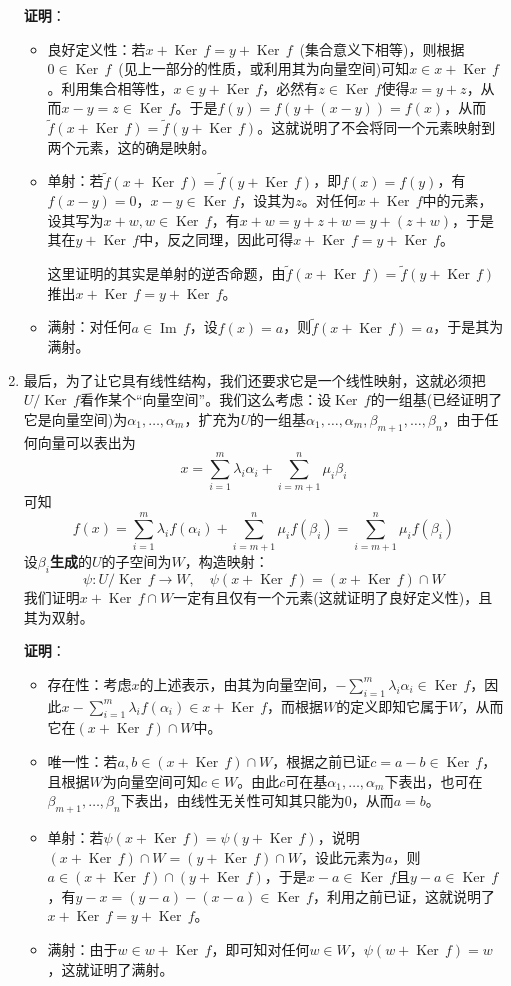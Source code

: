 \documentclass[a4paper,UTF8,fontset=windows]{ctexart}
\DeclareMathOperator{\im}{Im\,}
\DeclareMathOperator{\Ker}{Ker\,}
\newcommand*{\note}{\noindent *}
\begin{document}
\begin{enumerate}
    \textbf{证明}：
    \begin{itemize}
        \item 良好定义性：若$x+\Ker f=y+\Ker f$\ (集合意义下相等)，则根据$0\in\Ker f$\ (见上一部分的性质，或利用其为向量空间)可知$x\in x+\Ker f$。利用集合相等性，$x\in y+\Ker f$，必然有$z\in\Ker f$使得$x=y+z$，从而$x-y=z\in\Ker f$。于是$f(y)=f(y+(x-y))=f(x)$，从而$\tilde{f}(x+\Ker f)=\tilde{f}(y+\Ker f)$。这就说明了不会将同一个元素映射到两个元素，这的确是映射。
        \item 单射：若$\tilde{f}(x+\Ker f)=\tilde{f}(y+\Ker f)$，即$f(x)=f(y)$，有$f(x-y)=0$，$x-y\in\Ker f$，设其为$z$。对任何$x+\Ker f$中的元素，设其写为$x+w,w\in\Ker f$，有$x+w=y+z+w=y+(z+w)$，于是其在$y+\Ker f$中，反之同理，因此可得$x+\Ker f=y+\Ker f$。
        
        \note 这里证明的其实是单射的逆否命题，由$\tilde{f}(x+\Ker f)=\tilde{f}(y+\Ker f)$推出$x+\Ker f=y+\Ker f$。
        \item 满射：对任何$a\in\im f$，设$f(x)=a$，则$\tilde{f}(x+\Ker f)=a$，于是其为满射。
    \end{itemize}

    \item 最后，为了让它具有线性结构，我们还要求它是一个线性映射，这就必须把$U/\Ker f$看作某个``向量空间''。我们这么考虑：设$\Ker f$的一组基(已经证明了它是向量空间)为$\alpha_1,\dots,\alpha_m$，扩充为$U$的一组基$\alpha_1,\dots,\alpha_m,\beta_{m+1},\dots,\beta_n$，由于任何向量可以表出为
    $$x=\sum_{i=1}^m\lambda_i\alpha_i+\sum_{i=m+1}^n\mu_i\beta_i$$
    可知
    $$f(x)=\sum_{i=1}^m\lambda_if(\alpha_i)+\sum_{i=m+1}^n\mu_if(\beta_i)=\sum_{i=m+1}^n\mu_if(\beta_i)$$
    设$\beta_i$\textbf{生成}的$U$的子空间为$W$，构造映射：
    $$\psi:U/\Ker f\to W,\quad\psi(x+\Ker f)=(x+\Ker f)\cap W$$
    我们证明$x+\Ker f\cap W$一定有且仅有一个元素(这就证明了良好定义性)，且其为双射。
    
    \textbf{证明}：
    \begin{itemize}
        \item 存在性：考虑$x$的上述表示，由其为向量空间，$-\sum_{i=1}^m\lambda_i\alpha_i\in\Ker f$，因此$x-\sum_{i=1}^m\lambda_if(\alpha_i)\in x+\Ker f$，而根据$W$的定义即知它属于$W$，从而它在$(x+\Ker f)\cap W$中。
        \item 唯一性：若$a,b\in(x+\Ker f)\cap W$，根据之前已证$c=a-b\in\Ker f$，且根据$W$为向量空间可知$c\in W$。由此$c$可在基$\alpha_1,\dots,\alpha_m$下表出，也可在$\beta_{m+1},\dots,\beta_n$下表出，由线性无关性可知其只能为0，从而$a=b$。
        \item 单射：若$\psi(x+\Ker f)=\psi(y+\Ker f)$，说明$(x+\Ker f)\cap W=(y+\Ker f)\cap W$，设此元素为$a$，则$a\in(x+\Ker f)\cap(y+\Ker f)$，于是$x-a\in\Ker f$且$y-a\in\Ker f$，有$y-x=(y-a)-(x-a)\in\Ker f$，利用之前已证，这就说明了$x+\Ker f=y+\Ker f$。
        \item 满射：由于$w\in w+\Ker f$，即可知对任何$w\in W$，$\psi(w+\Ker f)=w$，这就证明了满射。
    \end{itemize}
    

\end{enumerate}
\end{document}
